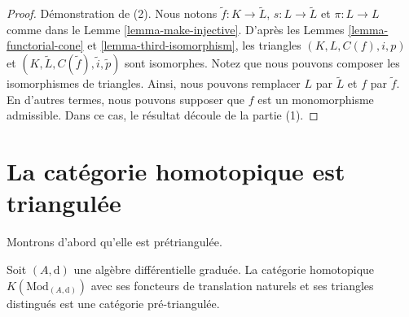 \begin{proof}
\medskip\noindent
Démonstration de (2). Nous notons $\tilde f : K \to \tilde L$, $s : L \to \tilde
L$ et $\pi : L \to L$ comme dans le Lemme \ref{lemma-make-injective}. D'après les
Lemmes \ref{lemma-functorial-cone} et \ref{lemma-third-isomorphism}, les
triangles $(K, L, C(f), i, p)$ et $(K, \tilde L, C(\tilde f), \tilde i, \tilde p)$
sont isomorphes. Notez que nous pouvons composer les isomorphismes de triangles.
Ainsi, nous pouvons remplacer $L$ par $\tilde L$ et $f$ par $\tilde f$. En
d'autres termes, nous pouvons supposer que $f$ est un monomorphisme admissible.
Dans ce cas, le résultat découle de la partie (1).
\end{proof}







\section{La catégorie homotopique est triangulée}
\label{section-homotopy-triangulated}

\noindent
Montrons d'abord qu'elle est prétriangulée.

\begin{lemma}
\label{lemma-homotopy-category-pre-triangulated}
Soit $(A, \text{d})$ une algèbre différentielle graduée. La catégorie homotopique
$K(\text{Mod}_{(A, \text{d})})$ avec ses foncteurs de translation naturels et ses
triangles distingués est une catégorie pré-triangulée.
\end{lemma}

